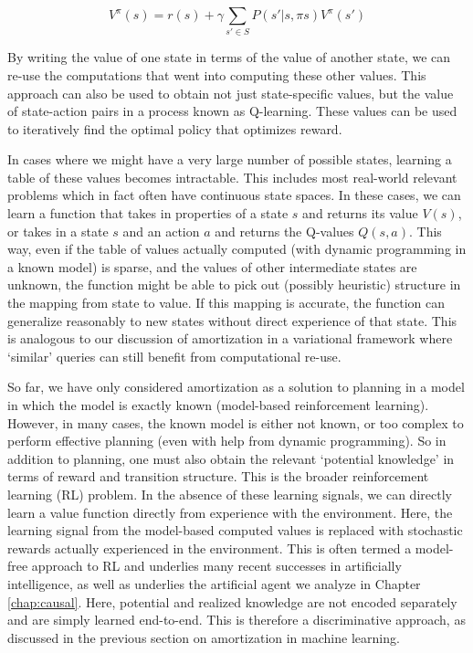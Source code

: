 \begin{equation}
V^{\pi}(s) = r(s) + \gamma \sum_{s' \in S} P(s' | s, \pi{s}) V^{\pi}(s')
\end{equation}

By writing the value of one state in terms of the value of another state, we can re-use the computations that went into computing these other values. This approach can also be used to obtain not just state-specific values, but the value of state-action pairs in a process known as Q-learning\citep{watkins1992q}. These values can be used to iteratively find the optimal policy that optimizes reward. 

In cases where we might have a very large number of possible states, learning a table of these values becomes intractable. This includes most real-world relevant problems which in fact often have continuous state spaces. In these cases, we can learn a function that takes in properties of a state $s$ and returns its value $V(s)$, or takes in a state $s$ and an action $a$ and returns the Q-values $Q(s,a)$. This way, even if the table of values actually computed (with dynamic programming in a known model) is sparse, and the values of other intermediate states are unknown, the function might be able to pick out (possibly heuristic) structure in the mapping from state to value. If this mapping is accurate, the function can generalize reasonably to new states without direct experience of that state. This is analogous to our discussion of amortization in a variational framework where `similar' queries can still benefit from computational re-use.

So far, we have only considered amortization as a solution to planning in a model in which the model is exactly known (model-based reinforcement learning). However, in many cases, the known model is either not known, or too complex to perform effective planning (even with help from dynamic programming). So in addition to planning, one must also obtain the relevant `potential knowledge' in terms of reward and transition structure. This is the broader reinforcement learning (RL) problem. In the absence of these learning signals, we can directly learn a value function directly from experience with the environment. Here, the learning signal from the model-based computed values is replaced with stochastic rewards actually experienced in the environment. This is often termed a model-free approach to RL and underlies many recent successes in artificially intelligence\citep{mnih2013playing}, as well as underlies the artificial agent we analyze in Chapter \ref{chap:causal}. Here, potential and realized knowledge are not encoded separately and are simply learned end-to-end. This is therefore a discriminative approach, as discussed in the previous section on amortization in machine learning.

